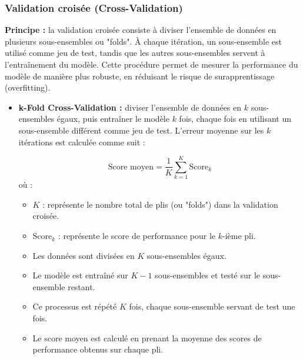 \subsubsection{Validation croisée (Cross-Validation)}
\textbf{Principe :} la validation croisée consiste à diviser l'ensemble de données en plusieurs sous-ensembles ou "folds". À chaque itération, un sous-ensemble est utilisé comme jeu de test, tandis que les autres sous-ensembles servent à l'entraînement du modèle. Cette procédure permet de mesurer la performance du modèle de manière plus robuste, en réduisant le risque de surapprentissage (overfitting).
\begin{itemize}
	\item \textbf{k-Fold Cross-Validation :} diviser l'ensemble de données en $k$ sous-ensembles égaux, puis entraîner le modèle $k$ fois, chaque fois en utilisant un sous-ensemble différent comme jeu de test. L'erreur moyenne sur les $k$ itérations est calculée comme suit :
	
	\begin{equation}
	\text{Score moyen} = \frac{1}{K} \sum_{k=1}^{K} \text{Score}_k
	\end{equation}
	où :
	\begin{itemize}
		\item $K$ : représente le nombre total de plis (ou "folds") dans la validation croisée.
		\item $\text{Score}_k$ : représente le score de performance pour le $k$-ième pli.
		\item Les données sont divisées en $K$ sous-ensembles égaux.
		\item Le modèle est entraîné sur $K-1$ sous-ensembles et testé sur le sous-ensemble restant.
		\item Ce processus est répété $K$ fois, chaque sous-ensemble servant de test une fois.
		\item Le score moyen est calculé en prenant la moyenne des scores de performance obtenus sur chaque pli.
	\end{itemize}
	

\end{itemize}

